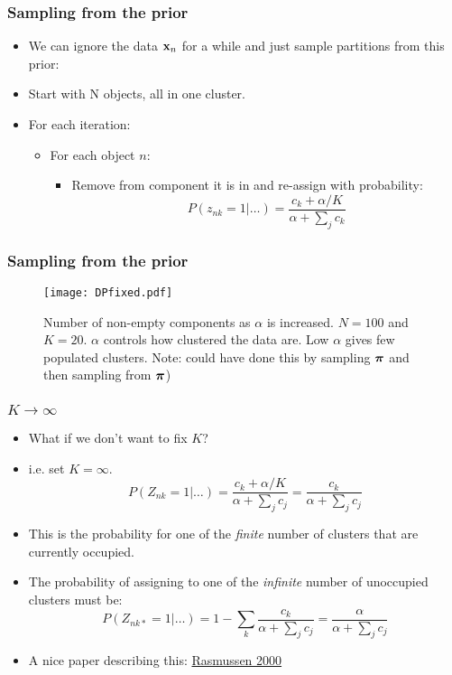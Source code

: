 \begin{frame}
	\frametitle{Sampling from the prior}
	\begin{itemize}
		\item We can ignore the data $\mathbf{x}_n$ for a while and just sample partitions from this prior:
		\item Start with N objects, all in one cluster.
		\item For each iteration:
		\begin{itemize}
			\item For each object $n$:
			\begin{itemize}
				\item Remove from component it is in and re-assign with probability:
				\[
					P(z_{nk} = 1|\ldots) = \frac{c_k + \alpha/K}{\alpha + \sum_j c_k}
				\]
			\end{itemize}
		\end{itemize}
	\end{itemize}
\end{frame}

\begin{frame}
	\frametitle{Sampling from the prior}
	\begin{figure}[tbh]
		\centering\texttt{[image: DPfixed.pdf]}
		\centering\caption{\label{fig:dpfixed}Number of non-empty components as $\alpha$ is increased. $N=100$ and $K=20$. $\alpha$ controls how clustered the data are. Low $\alpha$ gives few populated clusters. Note: could have done this by sampling $\boldsymbol\pi$ and then sampling from $\boldsymbol\pi$)}
	\end{figure}
\end{frame}

\begin{frame}
	\frametitle{$K\rightarrow \infty$}
	\begin{itemize}
		\item What if we don't want to fix $K$?
		\item i.e. set $K=\infty$.
		\[
		P(Z_{nk}=1|\ldots) = \frac{c_k + \alpha/K}{\alpha + \sum_j c_j} = \frac{c_k}{\alpha + \sum_j c_j}
		\]
		\item This is the probability for one of the \emph{finite} number of clusters that are currently occupied.
		\item<2-> The probability of assigning to one of the \emph{infinite} number of unoccupied clusters must be:
		\[
		P(Z_{nk*}=1|\ldots) = 1 - \sum_k \frac{c_k}{\alpha + \sum_j c_j} = \frac{\alpha}{\alpha + \sum_j c_j}
		\]
		\item<3->A nice paper describing this: \href{http://www.gatsby.ucl.ac.uk/~edward/pub/inf.mix.nips.99.pdf}{Rasmussen 2000}
	\end{itemize}
\end{frame}

